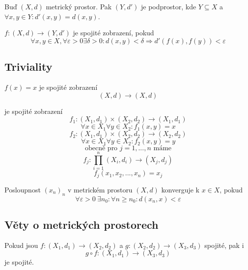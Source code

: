 \documentclass[../main.tex]{subfiles}
\begin{document}
\begin{definition}[Podprostor]
	Buď $(X, d)$ metrický prostor. Pak $(Y, d')$ je podprostor, kde $Y \subseteq X$ a $\forall x,y \in Y : d'(x,y) = d(x,y)$.
\end{definition}

\begin{definition}
	$f \colon (X,d) \to (Y, d')$ je spojité zobrazení, pokud
	\[ \forall x, y \in X, \forall \varepsilon > 0 \exists \delta > 0:
	d(x,y) < \delta \Rightarrow d'(f(x), f(y)) < \varepsilon \]
\end{definition}

\subsection{Triviality}

\begin{definition}
	$f(x) = x$ je spojité zobrazení
	\[ (X,d) \to (X,d) \]
\end{definition}

\begin{definition}
	je spojité zobrazení
	\[ f_1\colon (X_1,d_1)\times(X_2,d_2) \rightarrow (X_1,d_1) \]
	\[\forall x\in X_1 \forall y \in X_2 : f_1(x,y) = x\]
	\[f_2 \colon (X_1,d_1)\times(X_2,d_2) \rightarrow (X_2,d_2)\]
	\[\forall x\in X_1 \forall y \in X_2 : f_2(x,y) = y\]
	\[\text{obecně pro } j=1,...,n \text{ máme}\]
	\[f_j\colon\prod^n_{i=1}(X_i,d_i)\rightarrow(X_j,d_j)\]
	\[f_j(x_1,x_2,...,x_n) = x_j\]
\end{definition}

\begin{definition}[Konvergence]
	Posloupnost $(x_n)_n$ v metrickém prostoru $(X, d)$ konverguje k $x \in X$, pokud
	$$\forall \varepsilon > 0\ \exists n_0: \forall n \ge n_0: d(x_n, x) < \varepsilon$$
\end{definition}

\subsection{Věty o metrických prostorech}

\begin{theorem}
	Pokud jsou $f: (X_1,d_1) \to (X_2, d_2)$ a $g: (X_2,d_2) \to (X_3, d_3)$ spojité, pak i
	\[ g \circ f: (X_1,d_1) \to (X_3,d_3) \] je spojité.
\end{theorem}
\end{document}
